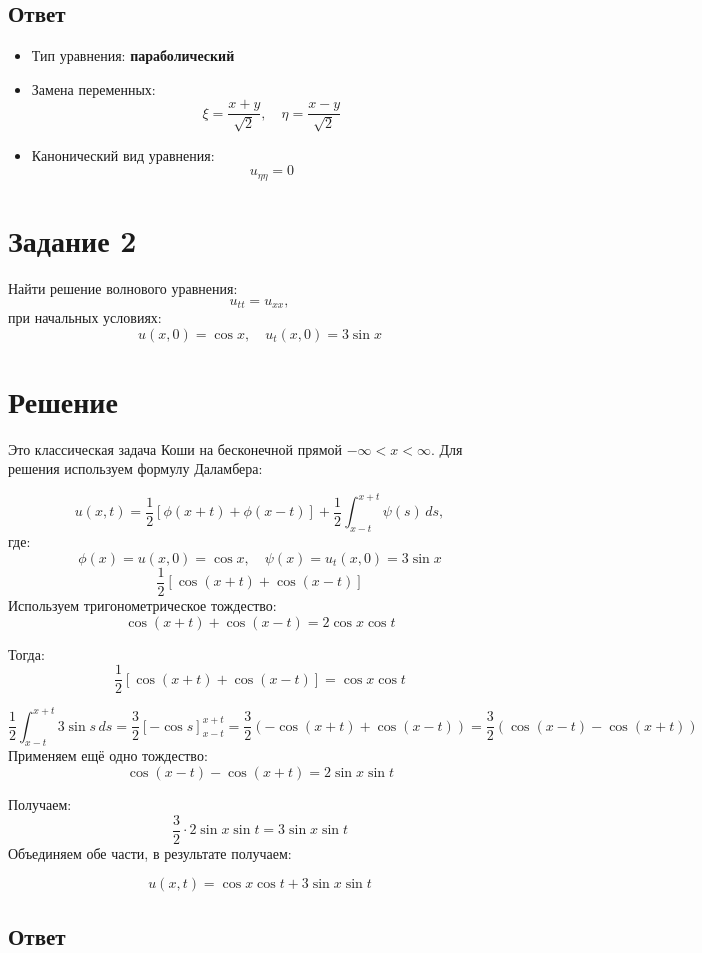 \documentclass{article}
\begin{document}
\subsection{Ответ}
\begin{itemize}
    \item Тип уравнения: \textbf{параболический}
    \item Замена переменных:
    \[
    \xi = \dfrac{x + y}{\sqrt{2}}, \quad \eta = \dfrac{x - y}{\sqrt{2}}
    \]
    \item Канонический вид уравнения:
    \[
    u_{\eta\eta} = 0
    \]
\end{itemize}




\section*{Задание 2}


Найти решение волнового уравнения:
$$
u_{tt} = u_{xx},
$$
при начальных условиях:
$$
u(x, 0) = \cos x, \quad u_t(x, 0) = 3 \sin x
$$

\section*{Решение}
Это классическая задача Коши на бесконечной прямой $ -\infty < x < \infty $. Для решения используем формулу Даламбера:

$$
u(x, t) = \frac{1}{2} \left[ \phi(x + t) + \phi(x - t) \right] + \frac{1}{2} \int_{x - t}^{x + t} \psi(s)\, ds,
$$
где:
$$
\phi(x) = u(x, 0) = \cos x, \quad \psi(x) = u_t(x, 0) = 3 \sin x
$$
$$
\frac{1}{2} \left[ \cos(x + t) + \cos(x - t) \right]
$$
Используем тригонометрическое тождество:
$$
\cos(x + t) + \cos(x - t) = 2 \cos x \cos t
$$

Тогда:
$$
\frac{1}{2} \left[ \cos(x + t) + \cos(x - t) \right] = \cos x \cos t
$$

$$
\frac{1}{2} \int_{x - t}^{x + t} 3 \sin s\, ds
= \frac{3}{2} \left[ -\cos s \right]_{x - t}^{x + t}
= \frac{3}{2} \left( -\cos(x + t) + \cos(x - t) \right)
= \frac{3}{2} \left( \cos(x - t) - \cos(x + t) \right)
$$
Применяем ещё одно тождество:
$$
\cos(x - t) - \cos(x + t) = 2 \sin x \sin t
$$

Получаем:
$$
\frac{3}{2} \cdot 2 \sin x \sin t = 3 \sin x \sin t
$$
Объединяем обе части, в результате получаем:

$$
u(x, t) = \cos x \cos t + 3 \sin x \sin t
$$

\subsection*{Ответ}
\end{document}
